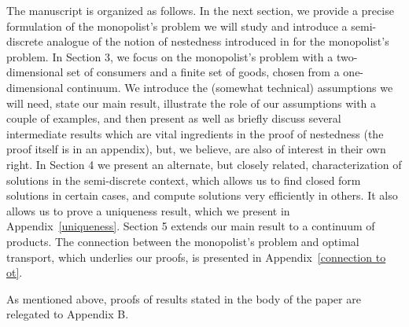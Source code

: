 \documentclass[12pt,reqno]{amsart}
\begin{document}
The manuscript is organized as follows.  In the next section, we provide a precise formulation of the monopolist's problem we will study and introduce a semi-discrete analogue of the notion of nestedness introduced in \cite{ChiapporiMcCannPass17} for the monopolist's problem.  In Section 3, we focus on the monopolist's problem with a two-dimensional set of consumers and a finite set of goods, chosen from a one-dimensional continuum.  We introduce the (somewhat technical) assumptions we will need, state our main result,  illustrate the role of our assumptions with a couple of examples, and then present as well as briefly discuss several intermediate results which are vital ingredients in the proof of nestedness (the proof itself is in an appendix), but, we believe, are also of interest in their own right.  In Section 4  we present an alternate, but closely related, characterization of solutions in the semi-discrete context, which allows us to find closed form solutions in certain cases, and compute solutions very efficiently in others.  %
It also allows us to prove a uniqueness result, which we present in Appendix~\ref{uniqueness}. Section 5  extends  our main result to a continuum of products. The connection between the monopolist's problem and optimal transport, which underlies our proofs, is presented in Appendix~\ref{connection to ot}.

As mentioned above, proofs of results stated in the body of the paper are relegated to Appendix B.
\end{document}
